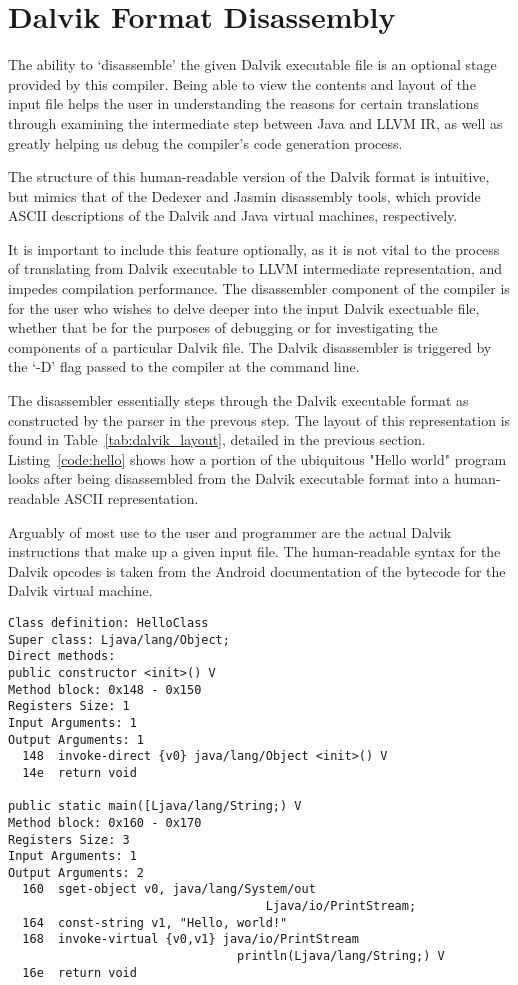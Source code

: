 \section{Dalvik Format Disassembly}
\label{sec:diss}

The ability to `disassemble' the given Dalvik executable file is an optional stage provided by this compiler. Being able to view the contents and layout of the input file helps the user in understanding the reasons for certain translations through examining the intermediate step between Java and LLVM IR, as well as greatly helping us debug the compiler's code generation process.

The structure of this human-readable version of the Dalvik format is intuitive, but mimics that of the Dedexer and Jasmin disassembly tools, which provide ASCII descriptions of the Dalvik and Java virtual machines, respectively\cite{dedexer}\cite{jasmin}. 

It is important to include this feature optionally, as it is not vital to the process of translating from Dalvik executable to LLVM intermediate representation, and impedes compilation performance. The disassembler component of the compiler is for the user who wishes to delve deeper into the input Dalvik exectuable file, whether that be for the purposes of debugging or for investigating the components of a particular Dalvik file. The Dalvik disassembler is triggered by the `-D' flag passed to the compiler at the command line.

The disassembler essentially steps through the Dalvik executable format as constructed by the parser in the prevous step. The layout of this representation is found in Table~\ref{tab:dalvik_layout}, detailed in the previous section. Listing~\ref{code:hello} shows how a portion of the ubiquitous "Hello world" program looks after being disassembled from the Dalvik executable format into a human-readable ASCII representation.

Arguably of most use to the user and programmer are the actual Dalvik instructions that make up a given input file. The human-readable syntax for the Dalvik opcodes is taken from the Android documentation of the bytecode for the Dalvik virtual machine\cite{dvk_bytecode}\cite{dvk_opcodes}.

\lstset{
	language=Assembler,
	basicstyle=\small,
	stringstyle=\ttfamily
}

\begin{lstlisting}[frame=single, numberstyle=\tiny, caption={Hello World program},label=code:hello]
Class definition: HelloClass
Super class: Ljava/lang/Object;
Direct methods:
public constructor <init>() V
Method block: 0x148 - 0x150
Registers Size: 1
Input Arguments: 1
Output Arguments: 1
  148  invoke-direct {v0} java/lang/Object <init>() V
  14e  return void

public static main([Ljava/lang/String;) V
Method block: 0x160 - 0x170
Registers Size: 3
Input Arguments: 1
Output Arguments: 2
  160  sget-object v0, java/lang/System/out
                                    Ljava/io/PrintStream;
  164  const-string v1, "Hello, world!"
  168  invoke-virtual {v0,v1} java/io/PrintStream
                                println(Ljava/lang/String;) V
  16e  return void     
\end{lstlisting}
